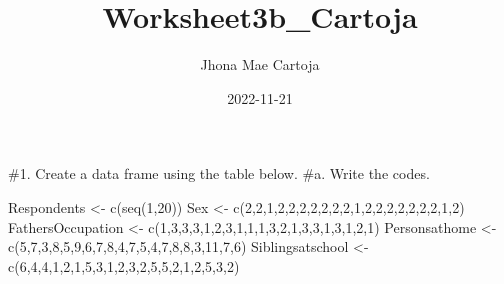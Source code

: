 \documentclass[
]{article}
\title{Worksheet3b\_Cartoja}
\author{Jhona Mae Cartoja}
\date{2022-11-21}
\newenvironment{Shaded}{\begin{snugshade}}{\end{snugshade}}
\newcommand{\DecValTok}[1]{\textcolor[rgb]{0.00,0.00,0.81}{#1}}
\newcommand{\FunctionTok}[1]{\textcolor[rgb]{0.00,0.00,0.00}{#1}}
\newcommand{\NormalTok}[1]{#1}
\newcommand{\OtherTok}[1]{\textcolor[rgb]{0.56,0.35,0.01}{#1}}
\begin{document}
\maketitle

\#1. Create a data frame using the table below. \#a. Write the codes.

\begin{Shaded}
\begin{Highlighting}[]
\NormalTok{Respondents }\OtherTok{\textless{}{-}} \FunctionTok{c}\NormalTok{(}\FunctionTok{seq}\NormalTok{(}\DecValTok{1}\NormalTok{,}\DecValTok{20}\NormalTok{))}
\NormalTok{Sex }\OtherTok{\textless{}{-}} \FunctionTok{c}\NormalTok{(}\DecValTok{2}\NormalTok{,}\DecValTok{2}\NormalTok{,}\DecValTok{1}\NormalTok{,}\DecValTok{2}\NormalTok{,}\DecValTok{2}\NormalTok{,}\DecValTok{2}\NormalTok{,}\DecValTok{2}\NormalTok{,}\DecValTok{2}\NormalTok{,}\DecValTok{2}\NormalTok{,}\DecValTok{2}\NormalTok{,}\DecValTok{1}\NormalTok{,}\DecValTok{2}\NormalTok{,}\DecValTok{2}\NormalTok{,}\DecValTok{2}\NormalTok{,}\DecValTok{2}\NormalTok{,}\DecValTok{2}\NormalTok{,}\DecValTok{2}\NormalTok{,}\DecValTok{2}\NormalTok{,}\DecValTok{1}\NormalTok{,}\DecValTok{2}\NormalTok{)}
\NormalTok{FathersOccupation }\OtherTok{\textless{}{-}} \FunctionTok{c}\NormalTok{(}\DecValTok{1}\NormalTok{,}\DecValTok{3}\NormalTok{,}\DecValTok{3}\NormalTok{,}\DecValTok{3}\NormalTok{,}\DecValTok{1}\NormalTok{,}\DecValTok{2}\NormalTok{,}\DecValTok{3}\NormalTok{,}\DecValTok{1}\NormalTok{,}\DecValTok{1}\NormalTok{,}\DecValTok{1}\NormalTok{,}\DecValTok{3}\NormalTok{,}\DecValTok{2}\NormalTok{,}\DecValTok{1}\NormalTok{,}\DecValTok{3}\NormalTok{,}\DecValTok{3}\NormalTok{,}\DecValTok{1}\NormalTok{,}\DecValTok{3}\NormalTok{,}\DecValTok{1}\NormalTok{,}\DecValTok{2}\NormalTok{,}\DecValTok{1}\NormalTok{)}
\NormalTok{Personsathome }\OtherTok{\textless{}{-}} \FunctionTok{c}\NormalTok{(}\DecValTok{5}\NormalTok{,}\DecValTok{7}\NormalTok{,}\DecValTok{3}\NormalTok{,}\DecValTok{8}\NormalTok{,}\DecValTok{5}\NormalTok{,}\DecValTok{9}\NormalTok{,}\DecValTok{6}\NormalTok{,}\DecValTok{7}\NormalTok{,}\DecValTok{8}\NormalTok{,}\DecValTok{4}\NormalTok{,}\DecValTok{7}\NormalTok{,}\DecValTok{5}\NormalTok{,}\DecValTok{4}\NormalTok{,}\DecValTok{7}\NormalTok{,}\DecValTok{8}\NormalTok{,}\DecValTok{8}\NormalTok{,}\DecValTok{3}\NormalTok{,}\DecValTok{11}\NormalTok{,}\DecValTok{7}\NormalTok{,}\DecValTok{6}\NormalTok{) }
\NormalTok{Siblingsatschool }\OtherTok{\textless{}{-}} \FunctionTok{c}\NormalTok{(}\DecValTok{6}\NormalTok{,}\DecValTok{4}\NormalTok{,}\DecValTok{4}\NormalTok{,}\DecValTok{1}\NormalTok{,}\DecValTok{2}\NormalTok{,}\DecValTok{1}\NormalTok{,}\DecValTok{5}\NormalTok{,}\DecValTok{3}\NormalTok{,}\DecValTok{1}\NormalTok{,}\DecValTok{2}\NormalTok{,}\DecValTok{3}\NormalTok{,}\DecValTok{2}\NormalTok{,}\DecValTok{5}\NormalTok{,}\DecValTok{5}\NormalTok{,}\DecValTok{2}\NormalTok{,}\DecValTok{1}\NormalTok{,}\DecValTok{2}\NormalTok{,}\DecValTok{5}\NormalTok{,}\DecValTok{3}\NormalTok{,}\DecValTok{2}\NormalTok{)}

\end{Highlighting}
\end{Shaded}
\end{document}
